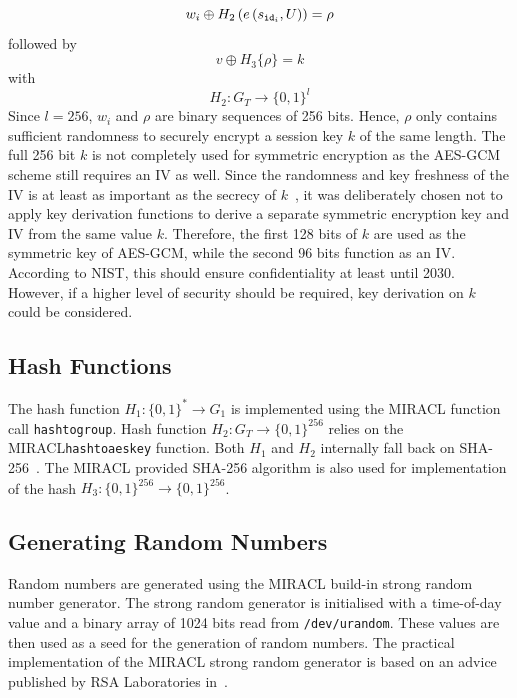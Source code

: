 \begin{equation*}
 w_i \oplus H_2 \left( e \left( s_{\mathtt{id}_{i}}, U \right) \right) = \rho
\end{equation*}
followed by
\begin{equation*}
 v \oplus H_3 \{ \rho \} = k
\end{equation*}
with
\begin{equation*}
 H_2: G_T \rightarrow \{ 0,1 \}^{l}
\end{equation*}
Since $l=256$, $w_i$ and $\rho$ are binary sequences of 256 bits. Hence, $\rho$ only contains sufficient randomness to securely encrypt a session key $k$ of the same length. The full 256 bit $k$ is not completely used for symmetric encryption as the AES-GCM scheme still requires an IV as well. Since the randomness and key freshness of the IV is at least as important as the secrecy of $k$~\cite{nist:dworkin}, it was deliberately chosen not to apply key derivation functions to derive a separate symmetric encryption key and IV from the same value $k$. Therefore, the first 128 bits of $k$ are used as the symmetric key of AES-GCM, while the second 96 bits function as an IV. According to NIST, this should ensure confidentiality at least until 2030. However, if a higher level of security should be required, key derivation on $k$ could be considered.

\subsection{Hash Functions}
The hash function $H_1: \{ 0,1 \}^{*} \rightarrow G_1$ is implemented using the MIRACL function call \texttt{hash\textunderscore to\textunderscore group}. Hash function $H_2: G_T \rightarrow \{ 0,1 \}^{256}$ relies on the MIRACL\texttt{hash\textunderscore to\textunderscore aes\textunderscore key} function. Both $H_1$ and $H_2$ internally fall back on SHA-256~\cite{nist:fips1804}. The MIRACL provided SHA-256 algorithm is also used for implementation of the hash $H_3: \{ 0, 1 \}^{256} \rightarrow \{ 0,1 \}^{256}$.

\subsection{Generating Random Numbers}
Random numbers are generated using the MIRACL build-in strong random number generator. The strong random generator is initialised with a time-of-day value and a binary array of 1024 bits read from \texttt{/dev/urandom}. These values are then used as a seed for the generation of random numbers. The practical implementation of the MIRACL strong random generator is based on an advice published by RSA Laboratories in~\cite{art:Matthews96}.

